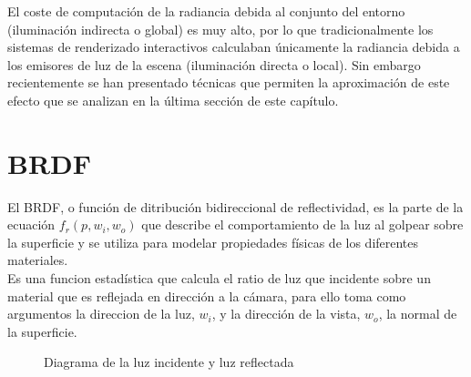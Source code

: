El coste de computaci\'on de la radiancia debida al conjunto del entorno (iluminaci\'on indirecta o global) es muy alto, por lo que
tradicionalmente los sistemas de renderizado interactivos calculaban \'unicamente la radiancia debida a los emisores de luz de la escena
(iluminaci\'on directa o local). Sin embargo recientemente se han presentado t\'ecnicas que permiten la aproximaci\'on
de este efecto que se analizan en la \'ultima secci\'on de este cap\'itulo.



\section{BRDF}

El BRDF, o función de ditribuci\'on bidireccional de reflectividad, es la parte de la ecuaci\'on $f_r(p, w_i, w_o)$ que describe el
comportamiento de la luz al golpear sobre la superficie y se utiliza para modelar propiedades f\'isicas de los diferentes
materiales.\\

Es una funcion estad\'istica que calcula el ratio de luz que incidente sobre un material que es reflejada en direcci\'on
a la c\'amara, para ello toma como argumentos la direccion de la luz, $w_i$, y la dirección de la vista,
$w_o$, la normal de la superficie.

\begin{figure}[H]
    \vspace{0.5cm}
    \centering
    \caption{Diagrama de la luz incidente y luz reflectada}
    \vspace{0.5cm}
\end{figure}

